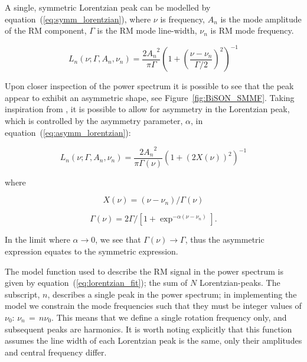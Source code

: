 A single, symmetric Lorentzian peak can be modelled by equation~(\ref{eq:symm_lorentzian}), where $\nu$ is frequency, $A_n$ is the mode amplitude of the RM component, $\Gamma$ is the RM mode line-width, $\nu_n$ is RM mode frequency.

\begin{equation}
L_n(\nu; \Gamma, A_n, \nu_n) = \frac{2{A_n}^2}{\pi \Gamma} \left(1 + \left(\frac{\nu - \nu_{n}}{\Gamma /2}\right)^2\right)^{-1} 
\label{eq:symm_lorentzian}
\end{equation}

Upon closer inspection of the power spectrum it is possible to see that the peak appear to exhibit an asymmetric shape, see Figure~\ref{fig:BiSON_SMMF}. Taking inspiration from \citep{howe_solar_2020}, it is possible to allow for asymmetry in the Lorentzian peak, which is controlled by the asymmetry parameter, $\alpha$, in equation~(\ref{eq:asymm_lorentzian}):

\begin{equation}
L_n(\nu; \Gamma, A_n, \nu_n) = \frac{2{A_n}^2}{\pi \Gamma(\nu)} \left(1 + \left(2X(\nu)\right)^2\right)^{-1} 
\label{eq:asymm_lorentzian}
\end{equation}

where

\begin{equation}
X(\nu) = (\nu - \nu_n)/\Gamma(\nu)
\label{eq:asymm_freq}
\end{equation}

\begin{equation}
\Gamma(\nu) = 2\Gamma / [1 + \exp^{-\alpha(\nu - \nu_n)}] .
\label{eq:asymm_width}
\end{equation}

In the limit where $\alpha \rightarrow 0$, we see that $\Gamma(\nu) \rightarrow \Gamma$, thus the asymmetric expression equates to the symmetric expression.

The model function used to describe the RM signal in the power spectrum is given by equation~(\ref{eq:lorentzian_fit}); the sum of $N$ Lorentzian-peaks. The subscript, $n$, describes a single peak in the power spectrum; in implementing the model we constrain the mode frequencies such that they must be integer values of $\nu_0$: $\nu_n \, = \, n \nu_0$. This means that we define a single rotation frequency only, and subsequent peaks are harmonics. It is worth noting explicitly that this function assumes the line width of each Lorentzian peak is the same, only their amplitudes and central frequency differ.

